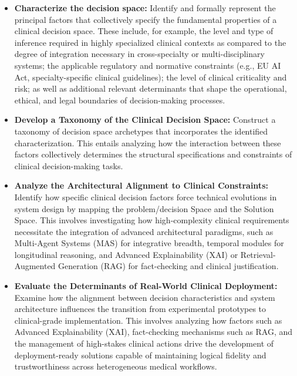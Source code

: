 \documentclass[review,12pt]{elsarticle}
\begin{document}
\begin{itemize}
    
    \item \textbf{Characterize the decision space:} Identify and formally represent the principal factors that collectively specify the fundamental properties of a clinical decision space. These include, for example, the level and type of inference required in highly specialized clinical contexts as compared to the degree of integration necessary in cross-specialty or multi-disciplinary systems; the applicable regulatory and normative constraints (e.g., EU AI Act, specialty-specific clinical guidelines); the level of clinical criticality and risk; as well as additional relevant determinants that shape the operational, ethical, and legal boundaries of decision-making processes.
    
    \item \textbf{Develop a Taxonomy of the Clinical Decision Space:}  Construct a taxonomy of decision space archetypes that incorporates the identified characterization. This entails analyzing how the interaction between these factors collectively determines the structural specifications and constraints of clinical decision-making tasks.

    \item  \textbf{Analyze the Architectural Alignment to Clinical Constraints:}  Identify how specific clinical decision factors force technical evolutions in system design by mapping the problem/decision Space and the Solution Space. This involves investigating how high-complexity clinical requirements necessitate the integration of advanced architectural paradigms, such as Multi-Agent Systems (MAS) for integrative breadth, temporal modules for longitudinal reasoning, and Advanced Explainability (XAI) or Retrieval-Augmented Generation (RAG) for fact-checking and clinical justification.

    \item \textbf{Evaluate the Determinants of Real-World Clinical Deployment:}  Examine how the alignment between decision characteristics and system architecture influences the transition from experimental prototypes to clinical-grade implementation. This involves analyzing how factors such as Advanced Explainability (XAI), fact-checking mechanisms such as RAG, and the management of high-stakes clinical actions drive the development of deployment-ready solutions capable of maintaining logical fidelity and trustworthiness across heterogeneous medical workflows.

    
    \end{itemize}
\end{document}
